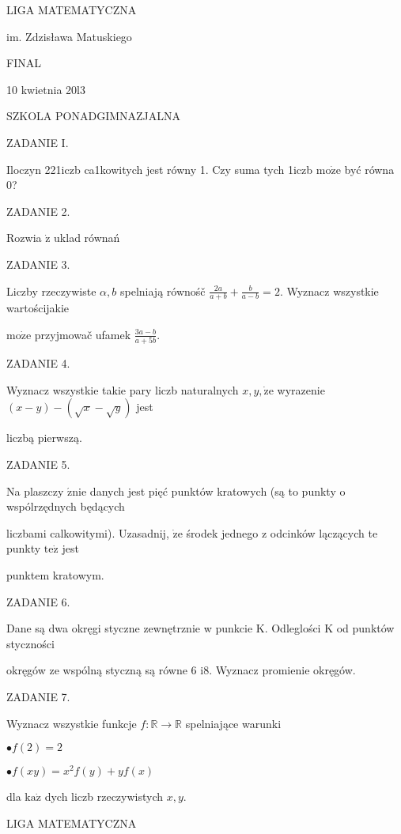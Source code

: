 \documentclass[a4paper,12pt]{article}
\begin{document}
LIGA MATEMATYCZNA

im. Zdzisława Matuskiego

FINAL

10 kwietnia 20l3

SZKOLA PONADGIMNAZJALNA

ZADANIE I.

Iloczyn 221iczb ca1kowitych jest równy 1. Czy suma tych 1iczb $\mathrm{m}\mathrm{o}\dot{\mathrm{z}}\mathrm{e}$ być równa 0?

ZADANIE 2.

Rozwia $\dot{\mathrm{z}}$ uklad równań 

ZADANIE 3.

Liczby rzeczywiste $\alpha, b$ spelniają równośč $\displaystyle \frac{2a}{a+b}+\frac{b}{a-b}=2$. Wyznacz wszystkie wartościjakie

$\mathrm{m}\mathrm{o}\dot{\mathrm{z}}\mathrm{e}$ przyjmowač ufamek $\displaystyle \frac{3a-b}{a+5b}.$

ZADANIE 4.

Wyznacz wszystkie takie pary liczb naturalnych $x, y, \dot{\mathrm{z}}\mathrm{e}$ wyrazenie $(x-y)-(\sqrt{x}-\sqrt{y})$ jest

liczbą pierwszą.

ZADANIE 5.

Na plaszczy $\acute{\mathrm{z}}\mathrm{n}\mathrm{i}\mathrm{e}$ danych jest pięć punktów kratowych (są to punkty o wspólrzędnych będących

liczbami calkowitymi). Uzasadnij, $\dot{\mathrm{z}}\mathrm{e}$ środek jednego z odcinków lączących te punkty $\mathrm{t}\mathrm{e}\dot{\mathrm{z}}$ jest

punktem kratowym.

ZADANIE 6.

Dane są dwa okręgi styczne zewnętrznie w punkcie K. Odleglości K od punktów styczności

okręgów ze wspólną styczną są równe 6 i8. Wyznacz promienie okręgów.

ZADANIE 7.

Wyznacz wszystkie funkcje $f:\mathbb{R}\rightarrow \mathbb{R}$ spelniające warunki

$\bullet f(2)=2$

$\bullet f(xy)=x^{2}f(y)+yf(x)$

dla $\mathrm{k}\mathrm{a}\dot{\mathrm{z}}$ dych liczb rzeczywistych $x, y.$






LIGA MATEMATYCZNA
\end{document}
